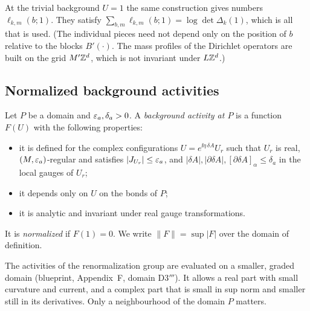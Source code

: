 At the trivial background $U=1$ the same construction gives numbers $\ell_{k,m}(b;1)$. They satisfy $\sum_{b,m}\ell_{k,m}(b;1)=\log\det\Delta_k(1)$, which is all that is used. (The individual pieces need not depend only on the position of $b$ relative to the blocks $B'(\cdot)$. The mass profiles of the Dirichlet operators are built on the grid $M'\mathbb Z^d$, which is not invariant under $L\mathbb Z^d$.)

\subsection{Normalized background activities}

\begin{definition}\label{def:bg-activity}
Let $P$ be a domain and $\varepsilon_a,\delta_a>0$. A \emph{background activity at $P$} is a function $F(U)$ with the following properties:
\begin{itemize}
\item it is defined for the complex configurations $U=e^{\ii\eta\,\delta\!A}U_r$ such that $U_r$ is real, $(M,\varepsilon_a)$-regular and satisfies $|J_{U_r}|\le\varepsilon_a$, and $|\delta\!A|,|\partial\delta\!A|,[\partial\delta\!A]_\alpha\le\delta_a$ in the local gauges of $U_r$;
\item it depends only on $U$ on the bonds of $P$;
\item it is analytic and invariant under real gauge transformations.
\end{itemize}
It is \emph{normalized} if $F(1)=0$. We write $\|F\|=\sup|F|$ over the domain of definition.
\end{definition}

The activities of the renormalization group are evaluated on a smaller, graded domain (blueprint, Appendix~F, domain D3$'''$). It allows a real part with small curvature and current, and a complex part that is small in sup norm and smaller still in its derivatives. Only a neighbourhood of the domain $P$ matters.

